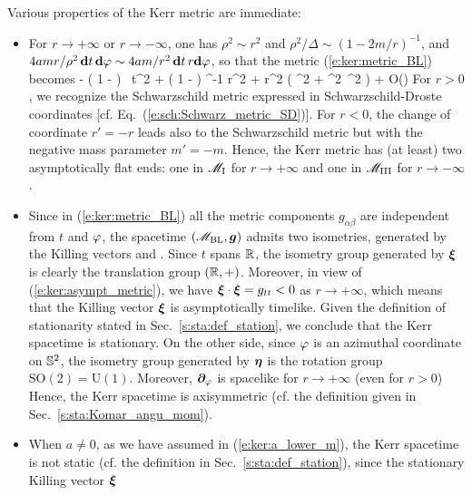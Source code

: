 Various properties of the Kerr metric are immediate:
\begin{itemize}
\item For $r\rightarrow+\infty$ or $r\rightarrow-\infty$, one has $\rho^2\sim r^2$ and
$\rho^2/\Delta \sim (1-2m/r)^{-1}$,
and $4 a m  r / \rho^2\,  \mathbf{d} t\, \mathbf{d}\varphi \sim 4 a m/r^2 \,  \mathbf{d} t\, r\mathbf{d}\varphi$,
so that the metric (\ref{e:ker:metric_BL}) becomes
\be \label{e:ker:asympt_metric}
      \simeq  - \left( 1 -  \right) \, \dd t^2
    + \left( 1 -  \right) ^{-1} \dd r^2
    + r^2 \left( \dd \th^2 + \sin^2\th  \, \dd \ph^2 \right)
    + O\left(\right)
\ee
For $r>0$, we recognize the Schwarzschild metric expressed
in Schwarzschild-Droste coordinates [cf. Eq.~(\ref{e:sch:Schwarz_metric_SD})].
For $r<0$, the change of coordinate $r'=-r$ leads also to the Schwarzschild metric
but with the negative mass parameter $m'=-m$.
Hence, the Kerr metric has (at least) two asymptotically flat ends: one in
$\mathscr{M}_{\rm I}$ for $r\rightarrow + \infty$ and one in $\mathscr{M}_{\rm III}$ for
$r\rightarrow - \infty$.
\item Since in (\ref{e:ker:metric_BL}) all the metric components $g_{\alpha\beta}$ are independent from $t$ and $\varphi$, the
spacetime $(\mathscr{M}_{\rm BL},\bm{g})$ admits two isometries, generated by the Killing
vectors
\be \label{e:ker:def_xi_eta}
     \quad\mbox{and}\quad
    \encadre{\w{\eta} := \wpar_\ph}.
\ee
Since $t$ spans $\mathbb{R}$, the isometry group generated by $\bm{\xi}$ is clearly
the translation group $(\mathbb{R},+)$. Moreover, in
view of (\ref{e:ker:asympt_metric}), we have $\bm{\xi}\cdot\bm{\xi} = g_{tt} < 0$
as $r\rightarrow +\infty$, which means that the Killing vector $\bm{\xi}$
is asymptotically timelike. Given the definition of stationarity stated in
Sec.~\ref{s:sta:def_station}, we conclude that the Kerr spacetime is
stationary.
On the other side, since $\varphi$ is an azimuthal coordinate
on $\mathbb{S}^2$, the isometry group generated by $\bm{\eta}$ is the rotation
group $\mathrm{SO}(2) = \mathrm{U}(1)$.
Moreover, $\bm{\partial}_\varphi$ is spacelike for $r\to +\infty$ (even for $r>0$)
Hence, the Kerr spacetime is axisymmetric (cf. the definition given in Sec.~\ref{s:sta:Komar_angu_mom}).
\item When $a\not=0$, as we have assumed in (\ref{e:ker:a_lower_m}), the
Kerr spacetime is not static (cf. the definition in Sec.~\ref{s:sta:def_station}), since the stationary Killing vector $\bm{\xi}$

\end{itemize}
